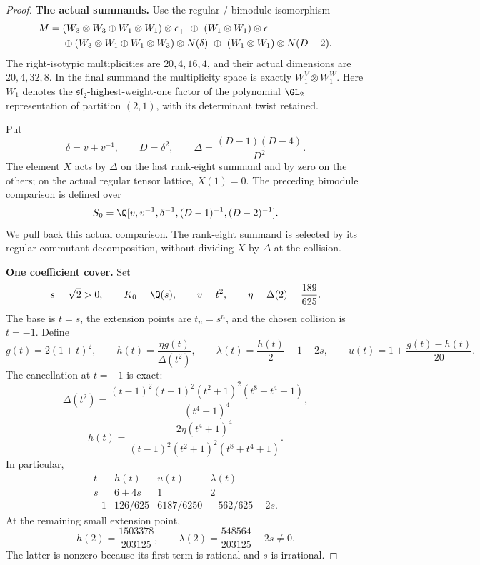 \begin{proof}
\par\smallskip\noindent\textbf{The actual summands.}\quad
Use the regular / bimodule isomorphism
\begin{align}
 M={}&(W_3\otimes W_3\oplus W_1\otimes W_1)
                          \otimes\epsilon_+
       \ \oplus\ (W_1\otimes W_1)\otimes\epsilon_-
       \notag\\
 &\oplus(W_3\otimes W_1\oplus W_1\otimes W_3)
                          \otimes N(\delta)
       \ \oplus\ (W_1\otimes W_1)\otimes N(D-2).
 \label{eq:fractionalactualmodule}
\end{align}
The right-isotypic multiplicities are $20,4,16,4$,
and their actual dimensions are $20,4,32,8$.
In the final summand the multiplicity space is exactly
$W_1^V\otimes W_1^W$.
Here $W_1$ denotes the $\mathfrak{sl}_2$-highest-weight-one
factor of the polynomial $\GL_2$ representation of
partition $(2,1)$, with its determinant twist retained.

Put
\[
 \delta=v+v^{-1},\qquad D=\delta^2,\qquad
 \Delta=\frac{(D-1)(D-4)}{D^2}.
\]
The element $X$ acts by $\Delta$ on the last rank-eight
summand and by zero on the others; on the actual regular
tensor lattice, $X(1)=0$.
The preceding bimodule comparison is defined over
\[
 S_0=\Q[v,v^{-1},\delta^{-1},(D-1)^{-1},(D-2)^{-1}].
\]
We pull back this actual comparison.
The rank-eight summand is selected by its regular
commutant decomposition, without dividing $X$ by
$\Delta$ at the collision.

\par\smallskip\noindent\textbf{One coefficient cover.}\quad
Set
\[
 s=\sqrt2>0,\qquad K_0=\Q(s),\qquad v=t^2,\qquad
 \eta=\Delta(2)=\frac{189}{625}.
\]
The base is $t=s$, the extension points are $t_n=s^n$,
and the chosen collision is $t=-1$.
Define
\begin{equation}\label{eq:fractionalfunctions}
 g(t)=2(1+t)^2,\qquad
 h(t)=\frac{\eta g(t)}{\Delta(t^2)},\qquad
 \lambda(t)=\frac{h(t)}2-1-2s,\qquad
 u(t)=1+\frac{g(t)-h(t)}{20}.
\end{equation}
The cancellation at $t=-1$ is exact:
\[
 \Delta(t^2)=
 \frac{(t-1)^2(t+1)^2(t^2+1)^2(t^8+t^4+1)}
      {(t^4+1)^4},
\]
\begin{equation}\label{eq:fractionalhcancellation}
 h(t)=\frac{2\eta(t^4+1)^4}
 {(t-1)^2(t^2+1)^2(t^8+t^4+1)}.
\end{equation}
In particular,
\[
\begin{array}{c|ccc}
 t&h(t)&u(t)&\lambda(t)\\ \hline
 s&6+4s&1&2\\
 -1&126/625&6187/6250&-562/625-2s .
\end{array}
\]
At the remaining small extension point,
\[
 h(2)=\frac{1503378}{203125},\qquad
 \lambda(2)=\frac{548564}{203125}-2s\ne0.
\]
The latter is nonzero because its first term is rational
and $s$ is irrational.


\end{proof}
